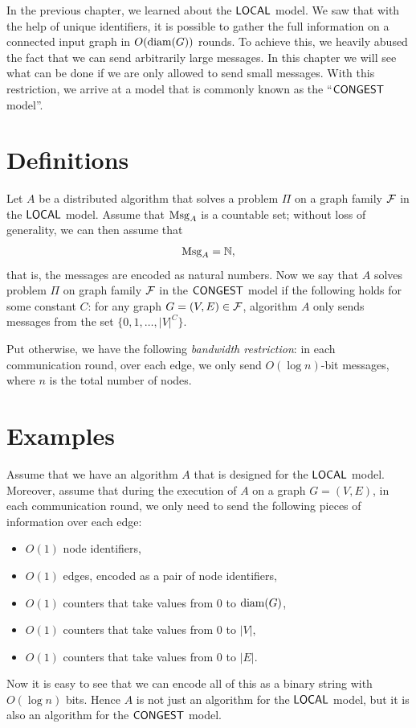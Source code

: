 

\noindent
In the previous chapter, we learned about the $\textup{\sffamily LOCAL}$ model. We saw that with the help of unique identifiers, it is possible to gather the full information on a connected input graph in $O(\operatorname{diam}(G))$ rounds. To achieve this, we heavily abused the fact that we can send arbitrarily large messages. In this chapter we will see what can be done if we are only allowed to send small messages. With this restriction, we arrive at a model that is commonly known as the ``$\textup{\sffamily CONGEST}$ model''.


\section{Definitions}\label{sec:congest}

Let $A$ be a distributed algorithm that solves a problem $\Pi$ on a graph family $\mathcal{F}$ in the $\textup{\sffamily LOCAL}$ model. Assume that $\operatorname{Msg}_A$ is a countable set; without loss of generality, we can then assume that
\[
    \operatorname{Msg}_A = \mathbb{N},
\]
that is, the messages are encoded as natural numbers. Now we say that $A$ solves problem $\Pi$ on graph family $\mathcal{F}$ in the $\textup{\sffamily CONGEST}$ model if the following holds for some constant $C$: for any graph $G = (V,E) \in \mathcal{F}$, algorithm $A$ only sends messages from the set $\{0, 1, \dotsc, |V|^C\}$.

Put otherwise, we have the following \emph{bandwidth restriction}: in each communication round, over each edge, we only send $O(\log n)$-bit messages, where $n$ is the total number of nodes.


\section{Examples}

Assume that we have an algorithm $A$ that is designed for the $\textup{\sffamily LOCAL}$ model. Moreover, assume that during the execution of $A$ on a graph $G = (V,E)$, in each communication round, we only need to send the following pieces of information over each edge:
\begin{itemize}[noitemsep]
    \item $O(1)$ node identifiers,
    \item $O(1)$ edges, encoded as a pair of node identifiers,
    \item $O(1)$ counters that take values from $0$ to $\operatorname{diam}(G)$,
    \item $O(1)$ counters that take values from $0$ to $|V|$,
    \item $O(1)$ counters that take values from $0$ to $|E|$.
\end{itemize}
Now it is easy to see that we can encode all of this as a binary string with $O(\log n)$ bits. Hence $A$ is not just an algorithm for the $\textup{\sffamily LOCAL}$ model, but it is also an algorithm for the $\textup{\sffamily CONGEST}$ model.

